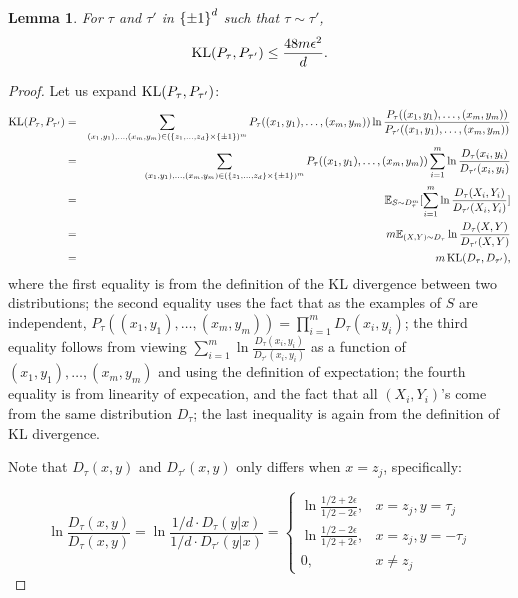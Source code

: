 \documentclass{article}
\newtheorem{lemma}{Lemma}
\DeclareMathOperator*{\KL}{{\rm KL}}
\newcommand{\EE}{\mathbb{E}}
\begin{document}
\begin{lemma}
For $\tau$ and $\tau'$ in $\cbr{\pm 1}^d$ such that $\tau \sim \tau'$,
\[ \KL(P_{\tau}, P_{\tau'}) \leq \frac{48 m \epsilon^2}{d}. \]
\label{lem:kl-tau}
\end{lemma}
\begin{proof}
Let us expand $\KL(P_{\tau}, P_{\tau'})$:
\begin{eqnarray*}
  \KL(P_{\tau}, P_{\tau'})
  &=& \sum_{(x_1,y_1), \ldots, (x_m, y_m) \in (\cbr{z_1,\ldots,z_d} \times \cbr{\pm 1})^m} P_{\tau}((x_1,y_1), \ldots,(x_m, y_m))
  \ln\frac{P_{\tau}((x_1,y_1), \ldots,(x_m, y_m))}{P_{\tau'}((x_1,y_1), \ldots,(x_m, y_m))} \\
  &=& \sum_{(x_1,y_1), \ldots, (x_m, y_m) \in (\cbr{z_1,\ldots,z_d} \times \cbr{\pm 1})^m} P_{\tau}((x_1,y_1), \ldots,(x_m, y_m))
  \sum_{i=1}^m \ln\frac{D_\tau(x_i,y_i)}{D_{\tau'}(x_i, y_i)} \\
  &=& \EE_{S \sim D_\tau^m}[ \sum_{i=1}^m \ln\frac{D_\tau(X_i,Y_i)}{D_{\tau'}(X_i, Y_i)} ] \\
  &=& m \EE_{(X, Y) \sim D_\tau} \ln\frac{D_\tau(X,Y)}{D_{\tau'}(X, Y)} \\
  &=& m \KL(D_\tau, D_{\tau'}),
\end{eqnarray*}
where the first equality is from the definition of the KL divergence between two distributions; the second equality uses the fact that as the examples of $S$ are independent,
$P_{\tau}((x_1,y_1), \ldots,(x_m, y_m)) = \prod_{i=1}^m D_\tau(x_i, y_i)$; the third equality follows from viewing $\sum_{i=1}^m \ln\frac{D_\tau(x_i,y_i)}{D_{\tau'}(x_i, y_i)}$ as a function of $(x_1,y_1), \ldots,(x_m, y_m)$ and using the definition of expectation; the fourth equality is from linearity of expecation, and the fact that all $(X_i, Y_i)$'s come from the same distribution $D_\tau$; the last inequality is again from the definition of KL divergence.

Note that $D_\tau(x,y)$ and $D_{\tau'}(x,y)$ only differs when $x = z_j$, specifically:


\[
\ln \frac{D_\tau(x,y)}{D_\tau(x, y)} = \ln\frac{1/d \cdot D_\tau(y|x)}{1/d \cdot D_{\tau'}(y|x)} =
\begin{cases}
  \ln\frac{1/2+2\epsilon}{1/2-2\epsilon}, & x = z_j, y = \tau_j \\ \ln\frac{1/2-2\epsilon}{1/2+2\epsilon}, & x = z_j, y = -\tau_j \\
  0, & x \neq z_j \end{cases}
\]


\end{proof}
\end{document}
